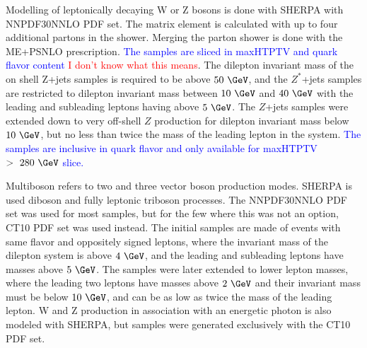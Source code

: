 \iffalse

 \begin{itemize}
 \item Detector simulation done with GEANT4.  GEANT4 models the ATLAS detector geometry, material interactions, and magnetic field potentials. 
 \item Pileup is modeled \textcolor{red}{how is it modeled}  
 \item \textcolor{blue}{Monte Carlo processed by sub-detector specific digitization algorithms, which translate the particle signatures in the detector into raw byte-stream data of the form that comes from the ATLAS detector.  Finally, fully simulated RDOs are reconstructed with release ?? of the ATLAS	 Athena reconstruction software, just like when processing real data.}
 \item \textcolor{red}{Do I want to make a schematic that illustrates the process of producing ATLAS MC simulation?}
 \end{itemize}
 \fi
 
 Modelling of leptonically decaying W or Z bosons is done with SHERPA with NNPDF30NNLO PDF set.  The matrix element is calculated with up to four additional partons in the shower.  Merging the parton shower is done with the ME+PS\@ NLO prescription.  \textcolor{blue}{The samples are sliced in maxHTPTV and quark flavor content} \textcolor{red}{I don't know what this means}.  The dilepton invariant mass of the on shell Z+jets samples is required to be above $50~\GeV$, and the $Z^*$+jets samples are restricted to dilepton invariant mass between $10~\GeV$ and $40~\GeV$ with the leading and subleading leptons having \pt above $5~\GeV$.  The $Z$+jets samples were extended down to very off-shell $Z$ production for dilepton invariant mass below $10~\GeV$, but no less than twice the mass of the leading lepton in the system.  \textcolor{blue}{The samples are inclusive in quark flavor and only available for maxHTPTV $>~280~\GeV$ slice.}
 
 Multiboson refers to two and three vector boson production modes.  SHERPA is used diboson and fully leptonic triboson processes.  The NNPDF30NNLO PDF set was used for most samples, but for the few where this was not an option, CT10 PDF set was used instead.  The initial samples are made of events with same flavor and oppositely signed leptons, where the invariant mass of the dilepton system is above $4~\GeV$, and the leading and subleading leptons have masses above $5~\GeV$.  The samples were later extended to lower lepton masses, where the leading two leptons have masses above $2~\GeV$ and their invariant mass must be below $10~\GeV$, and can be as low as twice the mass of the leading lepton.  W and Z production in association with an energetic photon is also modeled with SHERPA, but samples were generated exclusively with the CT10 PDF set.
 
